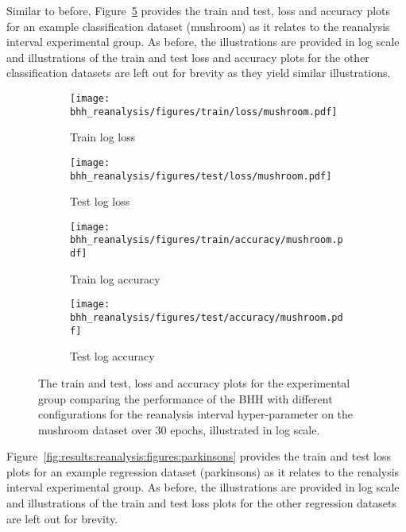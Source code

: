 Similar to before, Figure~\ref{fig:results:reanalysis:figures:mushroom} provides the train and test, loss and accuracy plots for an example classification dataset (mushroom) as it relates to the reanalysis interval experimental group. As before, the illustrations are provided in log scale and illustrations of the train and test loss and accuracy plots for the other classification datasets are left out for brevity as they yield similar illustrations.

\begin{figure}[htbp]
	\begin{subfigure}{0.5\textwidth}
		\centering
		\texttt{[image: bhh\_reanalysis/figures/train/loss/mushroom.pdf]}
		\caption{Train log loss}
		\label{fig:results:reanalysis:figures:loss:train:mushroom}
	\end{subfigure}
	\begin{subfigure}{0.5\textwidth}
		\centering
		\texttt{[image: bhh\_reanalysis/figures/test/loss/mushroom.pdf]}
		\caption{Test log loss}
		\label{fig:results:reanalysis:figures:loss:test:mushroom}
	\end{subfigure}
	\par\bigskip
	\begin{subfigure}{0.5\textwidth}
		\centering
		\texttt{[image: bhh\_reanalysis/figures/train/accuracy/mushroom.pdf]}
		\caption{Train log accuracy}
		\label{fig:results:reanalysis:figures:accuracy:train:mushroom}
	\end{subfigure}
	\begin{subfigure}{0.5\textwidth}
		\centering
		\texttt{[image: bhh\_reanalysis/figures/test/accuracy/mushroom.pdf]}
		\caption{Test log accuracy}
		\label{fig:results:reanalysis:figures:accuracy:test:mushroom}
	\end{subfigure}
	\par\bigskip
	\caption{The train and test, loss and accuracy plots for the experimental group comparing the performance of the \acs{BHH} with different configurations for the reanalysis interval hyper-parameter on the mushroom dataset over 30 epochs, illustrated in log scale.}
	\label{fig:results:reanalysis:figures:mushroom}
\end{figure}

Figure~\ref{fig:results:reanalysis:figures:parkinsons} provides the train and test loss plots for an example regression dataset (parkinsons) as it relates to the renalysis interval experimental group. As before, the illustrations are provided in log scale and illustrations of the train and test loss plots for the other regression datasets are left out for brevity.

